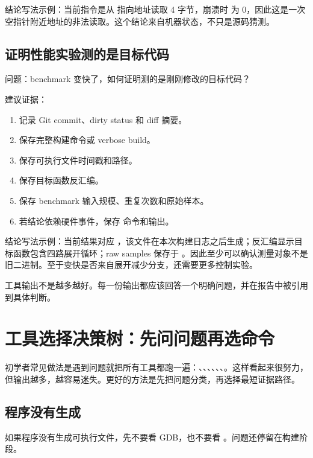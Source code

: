 结论写法示例：当前指令是从  指向地址读取 4 字节，崩溃时  为 0，因此这是一次空指针附近地址的非法读取。这个结论来自机器状态，不只是源码猜测。

\subsection{证明性能实验测的是目标代码}

问题：benchmark 变快了，如何证明测的是刚刚修改的目标代码？

建议证据：

\begin{enumerate}
  \item 记录 Git commit、dirty status 和 diff 摘要。
  \item 保存完整构建命令或 verbose build。
  \item 保存可执行文件时间戳和路径。
  \item 保存目标函数反汇编。
  \item 保存 benchmark 输入规模、重复次数和原始样本。
  \item 若结论依赖硬件事件，保存  命令和输出。
\end{enumerate}

结论写法示例：当前结果对应 ，该文件在本次构建日志之后生成；反汇编显示目标函数包含四路展开循环；raw samples 保存于 。因此至少可以确认测量对象不是旧二进制。至于变快是否来自展开减少分支，还需要更多控制实验。

\begin{mentalmodel}
工具输出不是越多越好。每一份输出都应该回答一个明确问题，并在报告中被引用到具体判断。
\end{mentalmodel}

\section{工具选择决策树：先问问题再选命令}

初学者常见做法是遇到问题就把所有工具都跑一遍：、、、、、、。这样看起来很努力，但输出越多，越容易迷失。更好的方法是先把问题分类，再选择最短证据路径。

\subsection{程序没有生成}

如果程序没有生成可执行文件，先不要看 GDB，也不要看 。问题还停留在构建阶段。

